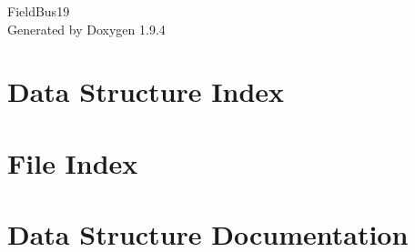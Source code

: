\documentclass[twoside]{book}
\newcommand{\+}{\discretionary{\mbox{\scriptsize$\hookleftarrow$}}{}{}}
\newcommand{\clearemptydoublepage}{%
    \newpage{\pagestyle{empty}\cleardoublepage}%
  }
\begin{document}
  \raggedbottom
    \hypersetup{pageanchor=false,
                bookmarksnumbered=true,
                pdfencoding=unicode
               }
  \begin{titlepage}
  \vspace*{7cm}
  \begin{center}%
  {\Large Field\+Bus19}\\
  \vspace*{1cm}
  {\large Generated by Doxygen 1.9.4}\\
  \end{center}
  \end{titlepage}
  \clearemptydoublepage
  \tableofcontents
  \clearemptydoublepage
  \hypersetup{pageanchor=true}
\chapter{Data Structure Index}

\chapter{File Index}

\chapter{Data Structure Documentation}









\end{document}
